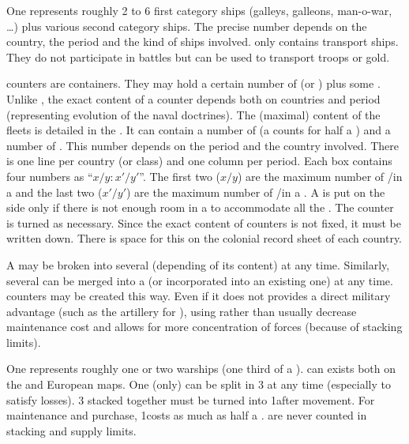 \aparag[Detachments.] One \ND represents roughly 2 to 6 first category ships
(galleys, galleons, man-o-war, \ldots) plus various second category ships. The
precise number depends on the country, the period and the kind of ships
involved.
\bparag \NTD only contains transport ships. They do not participate in battles
but can be used to transport troops or gold.

\aparag[Fleets.] \FLEET counters are containers. They may hold a certain
number of \NWD (or \NGD) plus some \NTD.
\bparag Unlike \ARMY, the exact content of a \FLEET counter depends both on
countries and period (representing evolution of the naval doctrines).
\bparag The (maximal) content of the fleets is detailed in the
. It can contain a number of \NWD (a
\NGD counts for half a \NWD) and a number of \NTD. This number depends on the
period and the country involved.
\bparag There is one line per country (or class) and one column per
period. Each box contains four numbers as ``$x/y:x'/y'$''. The first two
($x/y$) are the maximum number of \NWD/\NTD in a \FLEET\facemoins and the last
two ($x'/y'$) are the maximum number of \NWD/\NTD in a \FLEET\faceplus.
\bparag A \FLEET is put on the side \Faceplus only if there is not enough room
in a \FLEET\facemoins to accommodate all the \ND. The counter is turned as
necessary.
\bparag Since the exact content of \FLEET counters is not fixed, it must be
written down. There is space for this on the colonial record sheet of each
country.


 A \FLEET may be broken into several \ND
(depending of its content) at any time.
\bparag Similarly, several \ND can be merged into a \FLEET (or incorporated
into an existing one) at any time. \FLEET counters may be created this way.
\bparag Even if it does not provides a direct military advantage (such as the
artillery for \ARMY), using \FLEET rather than \ND usually decrease
maintenance cost and allows for more concentration of forces (because of
stacking limits).

 One \NDE represents roughly one or two
warships (one third of a \NWD).
\bparag \NDE can exists both on the \ROTW and European maps.
\bparag One \NWD (only) can be split in 3 \NDE at any time (especially to
satisfy losses). 3 \NDE stacked together must be turned into 1\NWD after
movement.
\bparag For maintenance and purchase, 1\NDE costs as much as half a \NWD.
\bparag \NDE are never counted in stacking and supply limits.

